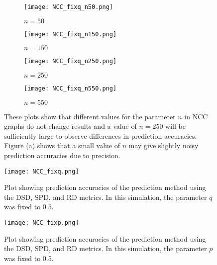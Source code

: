 \begin{figure}[H]
\begin{subfigure}[h]{0.5\linewidth}
\texttt{[image: NCC\_fixq\_n50.png]}
\caption{$n = 50$}
\end{subfigure}
\hfill
\begin{subfigure}[h]{0.5\linewidth}
\texttt{[image: NCC\_fixq\_n150.png]}
\caption{$n = 150$}
\end{subfigure}
\hfill
\begin{subfigure}[h]{0.5\linewidth}
\texttt{[image: NCC\_fixq\_n250.png]}
\caption{$n = 250$}
\end{subfigure}
\hfill
\begin{subfigure}[h]{0.5\linewidth}
\texttt{[image: NCC\_fixq\_n550.png]}
\caption{$n = 550$}
\end{subfigure}%
\caption{These plots show that different values for the parameter $n$ in NCC graphs do not change results and a value of $n=250$ will be sufficiently large to observe differences in prediction accuracies. Figure (a) shows that a small value of $n$ may give slightly noisy prediction accuracies due to precision.}
\label{fig:NCC_n}
\end{figure}

\begin{figure}[H]
\centering
\texttt{[image: NCC\_fixq.png]}
\caption{Plot showing prediction accuracies of the prediction method using the DSD, SPD, and RD metrics. In this simulation, the parameter $q$ was fixed to $0.5$.}
\label{fig:NCC_fixq}
\end{figure}

\begin{figure}[H]
\centering
\texttt{[image: NCC\_fixp.png]}
\caption{Plot showing prediction accuracies of the prediction method using the DSD, SPD, and RD metrics. In this simulation, the parameter $p$ was fixed to $0.5$.}
\label{fig:NCC_fixp}
\end{figure}



